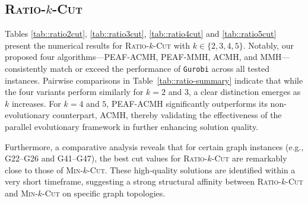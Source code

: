 \documentclass[12pt, a4paper]{article}%
\numberwithin{equation}{section}
\theoremstyle{plain}
\newcommand{\blue}{\textcolor{blue}}
\begin{document}
			
			\subsection{\textsc{Ratio}-$k$-\textsc{Cut}}
			\label{sec::ratio-k-cut}
			
			
			
			
			Tables \ref{tab::ratio2cut}, \ref{tab::ratio3cut}, \ref{tab::ratio4cut} and \ref{tab::ratio5cut} present the numerical results for \textsc{Ratio}-$k$-\textsc{Cut} with $k \in \{2, 3, 4, 5\}$. Notably, our proposed four algorithms---PEAF-ACMH, PEAF-MMH, ACMH, and MMH---consistently match or exceed the performance of \texttt{Gurobi} across all tested instances. Pairwise comparisons in Table~\ref{tab::ratio-summary} indicate that while the four variants perform similarly for $k=2$ and $3$, a clear distinction emerges as $k$ increases. For $k=4$ and $5$, PEAF-ACMH significantly outperforms its non-evolutionary counterpart, ACMH, thereby validating the effectiveness of the parallel evolutionary framework in further enhancing solution quality.
			
			Furthermore, a comparative analysis reveals that for certain graph instances (e.g., G22--G26 and G41--G47), the best cut values for \textsc{Ratio}-$k$-\textsc{Cut} are remarkably close to those of \textsc{Min}-$k$-\textsc{Cut}. These high-quality solutions are identified within a very short timeframe, suggesting a strong structural affinity between \textsc{Ratio}-$k$-\textsc{Cut} and \textsc{Min}-$k$-\textsc{Cut} on specific graph topologies.
			
\end{document}
